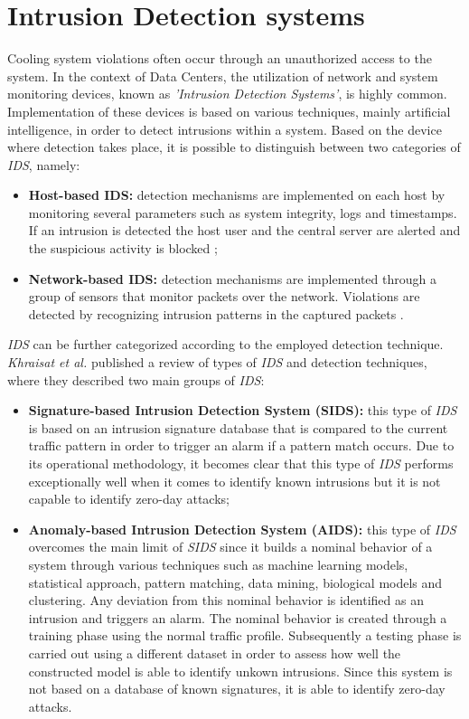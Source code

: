 \section{Intrusion Detection systems} \label{section:ids}
Cooling system violations often occur through an unauthorized access to the system. In the context of Data Centers, the utilization of network and system monitoring devices, known as \emph{'Intrusion Detection Systems'}, is highly common. Implementation of these devices is based on various techniques, mainly artificial intelligence, in order to detect intrusions within a system. Based on the device where detection takes place, it is possible to distinguish between two categories of \emph{IDS}, namely:
\begin{itemize}
    \item \textbf{Host-based IDS:} detection mechanisms are implemented on each host by monitoring several parameters such as system integrity, logs and timestamps. If an intrusion is detected the host user and the central server are alerted and the suspicious activity is blocked \cite{sulaiman2021intrusion};
    \item \textbf{Network-based IDS:} detection mechanisms are implemented through a group of sensors that monitor packets over the network. Violations are detected by recognizing intrusion patterns in the captured packets \cite{sulaiman2021intrusion}.
\end{itemize}
\emph{IDS} can be further categorized according to the employed detection technique. \emph{Khraisat et al.} \cite{khraisat2019survey} published a review of types of \emph{IDS} and detection techniques, where they described two main groups of \emph{IDS}:
\begin{itemize}
    \item \textbf{Signature-based Intrusion Detection System (SIDS):} this type of \emph{IDS} is based on an intrusion signature database that is compared to the current traffic pattern in order to trigger an alarm if a pattern match occurs. Due to its operational methodology, it becomes clear that this type of \emph{IDS} performs exceptionally well when it comes to identify known intrusions but it is not capable to identify zero-day attacks;
    \item \textbf{Anomaly-based Intrusion Detection System (AIDS):} this type of \emph{IDS} overcomes the main limit of \emph{SIDS} since it builds a nominal behavior of a system through various techniques such as machine learning models, statistical approach, pattern matching, data mining, biological models and clustering. Any deviation from this nominal behavior is identified as an intrusion and triggers an alarm. The nominal behavior is created through a training phase using the normal traffic profile. Subsequently a testing phase is carried out using a different dataset in order to assess how well the constructed model is able to identify unkown intrusions. Since this system is not based on a database of known signatures, it is able to identify zero-day attacks.  
\end{itemize}
